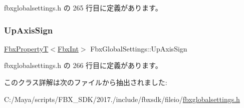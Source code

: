  fbxglobalsettings.\+h の 265 行目に定義があります。

\mbox{\label{class_fbx_global_settings_a12aa2b225f1fcc4999c2830062411c5d}} 
\subsubsection{\texorpdfstring{Up\+Axis\+Sign}{UpAxisSign}}
{\footnotesize\ttfamily \hyperlink{class_fbx_property_t}{Fbx\+PropertyT}$<$\hyperlink{fbxtypes_8h_a088fa96de3b0b3ea69f0f6afef525dfb}{Fbx\+Int}$>$ Fbx\+Global\+Settings\+::\+Up\+Axis\+Sign\hspace{0.3cm}{\ttfamily [protected]}}



 fbxglobalsettings.\+h の 266 行目に定義があります。



このクラス詳解は次のファイルから抽出されました\+:\begin{DoxyCompactItemize}
\item 
C\+:/\+Maya/scripts/\+F\+B\+X\+\_\+\+S\+D\+K/2017./include/fbxsdk/fileio/\hyperlink{fbxglobalsettings_8h}{fbxglobalsettings.\+h}\end{DoxyCompactItemize}

